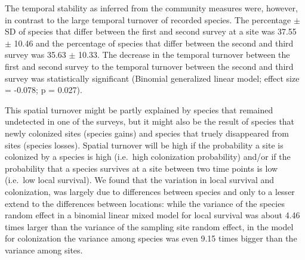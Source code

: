 \documentclass[fleqn,10pt,lineno]{wlpeerj} %
\begin{document}
The temporal stability as inferred from the community measures were,
however, in contrast to the large temporal turnover of recorded species.
The percentage \(\pm\) SD of species that differ between the first and
second survey at a site was 37.55 \(\pm\) 10.46 and the percentage of
species that differ between the second and third survey was 35.63
\(\pm\) 10.33. The decrease in the temporal turnover between the first
and second survey to the temporal turnover between the second and third
survey was statistically significant (Binomial generalized linear model;
effect size = -0.078; p = 0.027).

This spatial turnover might be partly explained by species that remained
undetected in one of the surveys, but it might also be the result of
species that newly colonized sites (species gains) and species that
truely disappeared from sites (species losses). Spatial turnover will be
high if the probability a site is colonized by a species is high
(i.e.~high colonization probability) and/or if the probability that a
species survives at a site between two time points is low (i.e.~low
local survival). We found that the variation in local survival and
colonization, was largely due to differences between species and only to
a lesser extend to the differences between locations: while the variance
of the species random effect in a binomial linear mixed model for local
survival was about 4.46 times larger than the variance of the sampling
site random effect, in the model for colonization the variance among
species was even 9.15 times bigger than the variance among sites.
\end{document}

